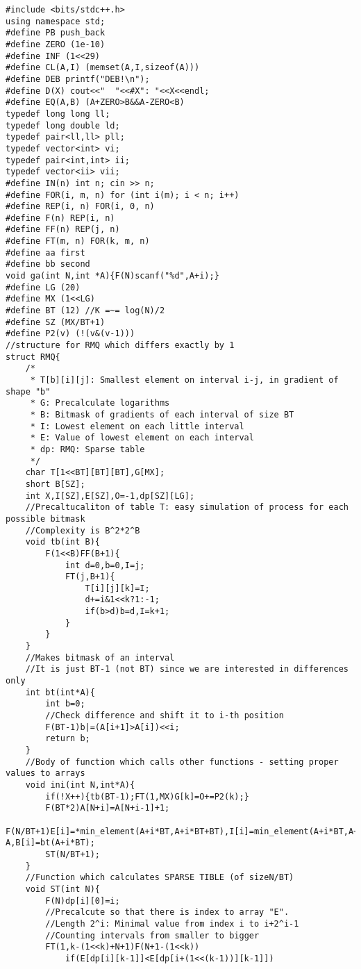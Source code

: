 \begin{lstlisting}
#include <bits/stdc++.h>
using namespace std;
#define PB push_back
#define ZERO (1e-10)
#define INF (1<<29)
#define CL(A,I) (memset(A,I,sizeof(A)))
#define DEB printf("DEB!\n");
#define D(X) cout<<"  "<<#X": "<<X<<endl;
#define EQ(A,B) (A+ZERO>B&&A-ZERO<B)
typedef long long ll;
typedef long double ld;
typedef pair<ll,ll> pll;
typedef vector<int> vi;
typedef pair<int,int> ii;
typedef vector<ii> vii;
#define IN(n) int n; cin >> n;
#define FOR(i, m, n) for (int i(m); i < n; i++)
#define REP(i, n) FOR(i, 0, n)
#define F(n) REP(i, n)
#define FF(n) REP(j, n)
#define FT(m, n) FOR(k, m, n)
#define aa first
#define bb second
void ga(int N,int *A){F(N)scanf("%d",A+i);}
#define LG (20)
#define MX (1<<LG)
#define BT (12) //K =~= log(N)/2
#define SZ (MX/BT+1)
#define P2(v) (!(v&(v-1)))
//structure for RMQ which differs exactly by 1
struct RMQ{
    /*
     * T[b][i][j]: Smallest element on interval i-j, in gradient of shape "b"
     * G: Precalculate logarithms
     * B: Bitmask of gradients of each interval of size BT
     * I: Lowest element on each little interval
     * E: Value of lowest element on each interval
     * dp: RMQ: Sparse table
     */
    char T[1<<BT][BT][BT],G[MX];
    short B[SZ];
    int X,I[SZ],E[SZ],O=-1,dp[SZ][LG];
    //Precaltucaliton of table T: easy simulation of process for each possible bitmask
    //Complexity is B^2*2^B
    void tb(int B){
        F(1<<B)FF(B+1){
            int d=0,b=0,I=j;
            FT(j,B+1){
                T[i][j][k]=I;
                d+=i&1<<k?1:-1;
                if(b>d)b=d,I=k+1;
            }
        }
    }
    //Makes bitmask of an interval
    //It is just BT-1 (not BT) since we are interested in differences only
    int bt(int*A){
        int b=0;
        //Check difference and shift it to i-th position
        F(BT-1)b|=(A[i+1]>A[i])<<i;
        return b;
    }
    //Body of function which calls other functions - setting proper values to arrays
    void ini(int N,int*A){
        if(!X++){tb(BT-1);FT(1,MX)G[k]=O+=P2(k);}
        F(BT*2)A[N+i]=A[N+i-1]+1;
        F(N/BT+1)E[i]=*min_element(A+i*BT,A+i*BT+BT),I[i]=min_element(A+i*BT,A+i*BT+BT)-A,B[i]=bt(A+i*BT);
        ST(N/BT+1);
    }
    //Function which calculates SPARSE TIBLE (of sizeN/BT)
    void ST(int N){
        F(N)dp[i][0]=i;
        //Precalcute so that there is index to array "E".
        //Length 2^i: Minimal value from index i to i+2^i-1
        //Counting intervals from smaller to bigger
        FT(1,k-(1<<k)+N+1)F(N+1-(1<<k))
            if(E[dp[i][k-1]]<E[dp[i+(1<<(k-1))][k-1]])

\end{lstlisting}
